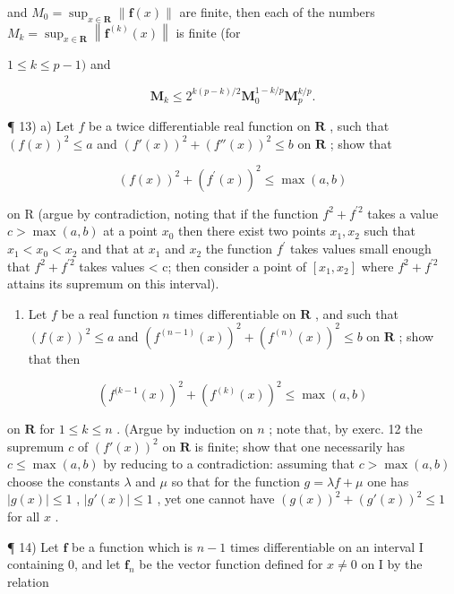 and \(M_{0}=\sup_{x\in\mathbf{R}}\|\mathbf{f}(x)\|\) are finite, then each of the numbers \(M_{k}=\sup_{x\in\mathbf{R}}\left\|\mathbf{f}^{(k)}(x)\right\|\) is finite (for

\(1 \leqslant k \leqslant p - 1)\) and

\[
\mathbf {M} _ {k} \leqslant 2 ^ {k (p - k) / 2} \mathbf {M} _ {0} ^ {1 - k / p} \mathbf {M} _ {p} ^ {k / p}.
\]

¶ 13) a) Let \(f\) be a twice differentiable real function on \(\mathbf{R}\) , such that \((f(x))^2 \leqslant a\) and \((f'(x))^2 + (f''(x))^2 \leqslant b\) on \(\mathbf{R}\) ; show that

\[
(f (x)) ^ {2} + \left(f ^ {\prime} (x)\right) ^ {2} \leqslant \max (a, b)
\]

on R (argue by contradiction, noting that if the function \(f^{2}+f^{\prime2}\) takes a value \(c > \max(a, b)\) at a point \(x_{0}\) then there exist two points \(x_{1}, x_{2}\) such that \(x_{1} < x_{0} < x_{2}\) and that at \(x_{1}\) and \(x_{2}\) the function \(f^{\prime}\) takes values small enough that \(f^{2} + f^{\prime2}\) takes values \textless{} c; then consider a point of \([x_{1}, x_{2}]\) where \(f^{2} + f^{\prime2}\) attains its supremum on this interval).

\begin{enumerate}
\def\labelenumi{\alph{enumi})}
\setcounter{enumi}{1}
\tightlist
\item
  Let \(f\) be a real function \(n\) times differentiable on \(\mathbf{R}\) , and such that \((f(x))^2 \leqslant a\) and \((f^{(n - 1)}(x))^2 + (f^{(n)}(x))^2 \leqslant b\) on \(\mathbf{R}\) ; show that then
\end{enumerate}

\[
(f ^ {(k - 1} (x)) ^ {2} + (f ^ {(k)} (x)) ^ {2} \leqslant \max (a, b)
\]

on \(\mathbf{R}\) for \(1 \leqslant k \leqslant n\) . (Argue by induction on \(n\) ; note that, by exerc. 12 the supremum \(c\) of \((f'(x))^2\) on \(\mathbf{R}\) is finite; show that one necessarily has \(c \leqslant \max(a, b)\) by reducing to a contradiction: assuming that \(c > \max(a, b)\) choose the constants \(\lambda\) and \(\mu\) so that for the function \(g = \lambda f + \mu\) one has \(|g(x)| \leqslant 1\) , \(|g'(x)| \leqslant 1\) , yet one cannot have \((g(x))^2 + (g'(x))^2 \leqslant 1\) for all \(x\) .

¶ 14) Let \(\mathbf{f}\) be a function which is \(n - 1\) times differentiable on an interval I containing 0, and let \(\mathbf{f}_n\) be the vector function defined for \(x \neq 0\) on I by the relation

